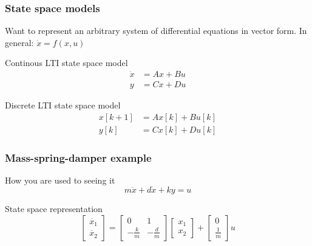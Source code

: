 \documentclass{beamer}
\begin{document}
\begin{frame}
    \frametitle{State space models}
    Want to represent an arbitrary system of differential equations in vector form. In general: $\dot{x} = f(x, u)$

    \begin{block}{Continous LTI state space model}
        \begin{equation}
        \begin{aligned}
            \dot{x} &= A x + B u \\
            y &=C x + D u
        \end{aligned}
        \end{equation}
    \end{block}

    \begin{block}{Discrete LTI state space model}
        \begin{equation}
        \begin{aligned}
            x[k+1] &= A x[k] + B u[k] \\
            y[k] &= C x[k] + D u[k]
        \end{aligned}
        \end{equation}
    \end{block}
\end{frame}


\begin{frame}
    \frametitle{Mass-spring-damper example}

    \begin{block}{How you are used to seeing it}
        \begin{equation}
            m \ddot{x}+d \dot{x} + ky=u
        \end{equation}
    \end{block}

    \begin{block}{State space representation}
        \begin{equation}
        \left[\begin{array}{c}{{\dot{x_1}}} \\ {\dot{x_2}}\end{array}\right] =\left[\begin{array}{cc}{0} & {1} \\ {-\frac{k}{m}} & {-\frac{d}{m}}\end{array}\right] \left[\begin{array}{c}{{x_1}} \\ {x_2}\end{array}\right] +\left[\begin{array}{c}{0} \\ {\frac{1}{m}}\end{array}\right] u
        \end{equation}
    \end{block}
\end{frame}
\end{document}
